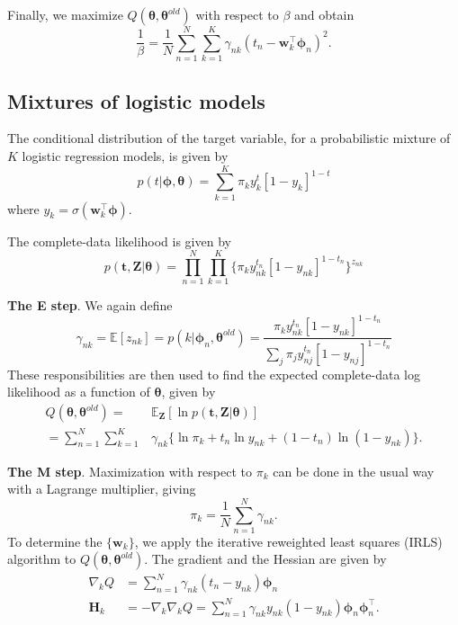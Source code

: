 \documentclass[a4paper]{report}
\renewcommand{\bf}{\mathbf}
\newcommand{\bb}{\mathbb}
\newcommand{\bs}{\boldsymbol}
\begin{document}
Finally, we maximize $Q(\bs{\theta},\bs{\theta}^{old})$ with respect to $\beta$ and obtain
\begin{equation}
	\frac{1}{\beta} = \frac{1}{N} \sum_{n=1}^N \sum_{k=1}^K \gamma_{nk}(t_n - \bf{w}_k^{\intercal} \bs{\phi}_n)^2.
\end{equation}
\subsection{Mixtures of logistic models}
The conditional distribution of the target variable, for a probabilistic mixture of $K$ logistic regression models, is given by
\begin{equation}
	p(t|\bs{\phi,\theta}) = \sum_{k=1}^K \pi_k y_k^t[1-y_k]^{1-t}
\end{equation}
where $y_k = \sigma(\bf{w}_k^{\intercal} \bs{\phi})$.

The complete-data likelihood is given by
\begin{equation}
	p(\bf{t,Z}|\bs{\theta}) = \prod_{n=1}^N \prod_{k=1}^K \{ \pi_k y_{nk}^{t_n}[1-y_{nk}]^{1-t_n} \}^{z_{nk}}
\end{equation}

\textbf{The E step}. We again define
\begin{equation}
	\gamma_{nk} = \bb{E}[z_{nk}] = p(k|\bs{\phi}_n,\bs{\theta}^{old}) = \frac{\pi_k y_{nk}^{t_n}[1-y_{nk}]^{1-t_n}}{\sum_j \pi_j y_{nj}^{t_n}[1-y_{nj}]^{1-t_n}}
\end{equation}
These responsibilities are then used to find the expected complete-data log likelihood as a function of $\bs{\theta}$, given by
\begin{align}
	Q(\bs{\theta},\bs{\theta}^{old}) = &\bb{E}_{\bf{Z}}[\ln p(\bf{t,Z}|\bs{\theta})] \\
	=\sum_{n=1}^N \sum_{k=1}^K & \gamma_{nk} \{ \ln \pi_k + t_n \ln y_{nk}+(1-t_n)\ln(1-y_{nk}) \}.
\end{align}

\textbf{The M step}. Maximization with respect to $\pi_k$ can be done in the usual way with a Lagrange multiplier, giving
\begin{equation}
\pi_k = \frac{1}{N} \sum_{n=1}^N \gamma_{nk}.
\end{equation}
To determine the $\{ \bf{w}_k\}$, we apply the iterative reweighted least squares (IRLS) algorithm to $Q(\bs{\theta},\bs{\theta}^{old})$. The gradient and the Hessian are given by
\begin{align}
	\nabla_k Q &= \sum_{n=1}^N \gamma_{nk} (t_n-y_{nk})\bs{\phi}_n \\
	\bf{H}_k &= - \nabla_k \nabla_k Q = \sum_{n=1}^N \gamma_{nk} y_{nk} (1-y_{nk}) \bs{\phi}_n \bs{\phi}_n^{\intercal}.
\end{align}
\end{document}
